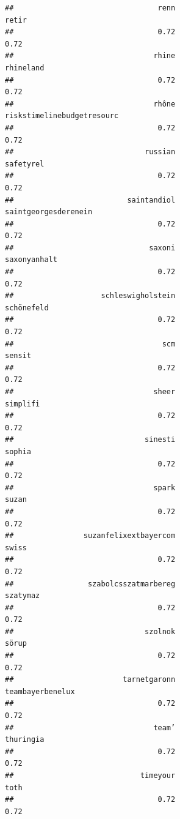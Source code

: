 \documentclass[
]{article}
\begin{document}
\begin{verbatim}
##                                 renn                                retir 
##                                 0.72                                 0.72 
##                                rhine                            rhineland 
##                                 0.72                                 0.72 
##                                rhône           riskstimelinebudgetresourc 
##                                 0.72                                 0.72 
##                              russian                            safetyrel 
##                                 0.72                                 0.72 
##                          saintandiol                 saintgeorgesderenein 
##                                 0.72                                 0.72 
##                               saxoni                         saxonyanhalt 
##                                 0.72                                 0.72 
##                    schleswigholstein                           schönefeld 
##                                 0.72                                 0.72 
##                                  scm                               sensit 
##                                 0.72                                 0.72 
##                                sheer                             simplifi 
##                                 0.72                                 0.72 
##                              sinesti                               sophia 
##                                 0.72                                 0.72 
##                                spark                                suzan 
##                                 0.72                                 0.72 
##                suzanfelixextbayercom                                swiss 
##                                 0.72                                 0.72 
##                 szabolcsszatmarbereg                             szatymaz 
##                                 0.72                                 0.72 
##                              szolnok                                sörup 
##                                 0.72                                 0.72 
##                         tarnetgaronn                     teambayerbenelux 
##                                 0.72                                 0.72 
##                                team’                            thuringia 
##                                 0.72                                 0.72 
##                             timeyour                                 toth 
##                                 0.72                                 0.72 

\end{verbatim}
\end{document}
